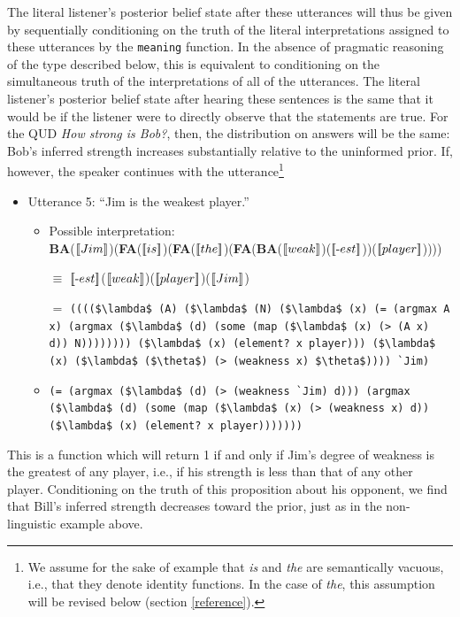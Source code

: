 \documentclass[12pt]{article}
\newcommand{\llbracket}{\ensuremath{\left [\!\left [}}%
\newcommand{\rrbracket}{\ensuremath{\right ]\!\right ]}}
\providecommand{\sv}[1]{\ensuremath{\llbracket #1 \rrbracket}}
\begin{document}
The literal listener's posterior belief state after these utterances will thus be given by sequentially conditioning on the truth of the literal interpretations assigned to these utterances by the \lstinline{meaning} function. 
In the absence of pragmatic reasoning of the type described below, this is equivalent to conditioning on the simultaneous truth of the interpretations of all of the utterances. 
The literal listener's posterior belief state after hearing these sentences is the same that it would be if the listener were to directly observe that the statements are true. 
For the QUD \emph{How strong is Bob?}, then, the distribution on answers will be the same: Bob's inferred strength increases substantially relative to the uninformed prior. 
If, however, the speaker continues with the utterance\footnote{We assume for the sake of example that \emph{is} and \emph{the} are semantically vacuous, i.e., that they denote identity functions. In the case of \emph{the}, this assumption will be revised below (section \ref{reference}).}
\begin{itemize}
\item Utterance 5: ``Jim is the weakest player.''
\begin{itemize}
\item Possible interpretation:\\ 
\textbf{BA}(\sv{Jim})(\textbf{FA}(\sv{is})(\textbf{FA}(\sv{the})(\textbf{FA}(\textbf{BA}(\sv{weak})(\sv{\text{-}est}))(\sv{player}))))
\item [$\equiv$] \sv{\text{-}est}(\sv{weak})(\sv{player})(\sv{Jim})
\item [$=$] \lstinline[mathescape]{(((($\lambda$ (A) ($\lambda$ (N) ($\lambda$ (x) (= (argmax A x) (argmax ($\lambda$ (d) (some (map ($\lambda$ (x) (> (A x) d)) N)))))))) ($\lambda$ (x) (element? x player))) ($\lambda$ (x) ($\lambda$ ($\theta$) (> (weakness x) $\theta$)))) `Jim)}
\item [$\equiv$] \lstinline[mathescape]{(= (argmax ($\lambda$ (d) (> (weakness `Jim) d))) (argmax ($\lambda$ (d) (some (map ($\lambda$ (x) (> (weakness x) d)) ($\lambda$ (x) (element? x player)))))))    }
\end{itemize}
\end{itemize}
This is a function which will return 1 if and only if Jim's degree of weakness is the greatest of any player, i.e., if his strength is less than that of any other player. 
Conditioning on the truth of this proposition about his opponent, we find that Bill's inferred strength decreases toward the prior, just as in the non-linguistic example above. 
\end{document}
